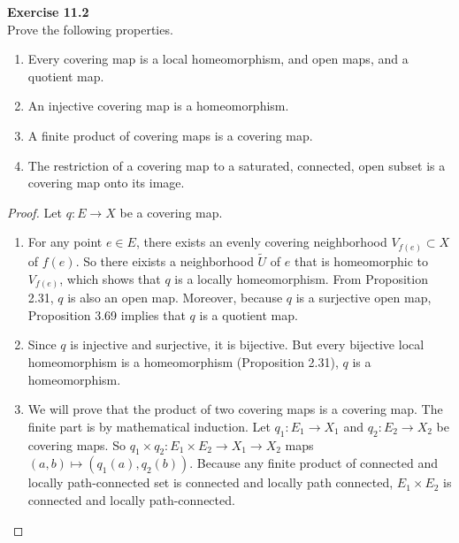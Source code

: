 \documentclass[12pt, a4paper]{article}
\theoremstyle{plain}
\def\tilde{\widetilde}
\newenvironment{exercise}[2][Exercise]
    { \begin{mdframed}[backgroundcolor=gray!20] \textbf{#1 #2} \\}
    {  \end{mdframed}}
\begin{document}
\begin{exercise}{11.2}
    Prove the following properties.
    \begin{enumerate}[label=(\alph*)]
        \item Every covering map is a local homeomorphism, and open maps, and a quotient map.
        \item An injective covering map is a homeomorphism.
        \item A finite product of covering maps is a covering map.
        \item The restriction of a covering map to a saturated, connected, open subset is a covering map onto its image.
    \end{enumerate}
\end{exercise}
    \begin{proof}
    Let $q\colon E\to X$ be a covering map.
    \begin{enumerate}[label=(\alph*)]
        \item For any point $e\in E$, there exists an evenly covering neighborhood $V_{f(e)}\subset X$ of $f(e)$. So there eixists a neighborhood $\tilde U$ of $e$ that is homeomorphic to $V_{f(e)}$, which shows that $q$ is a locally homeomorphism. From Proposition 2.31, $q$ is also an open map. Moreover, because $q$ is a surjective open map, Proposition 3.69 implies that $q$ is a quotient map.
        \item Since $q$ is injective and surjective, it is bijective. But every bijective local homeomorphism is a homeomorphism (Proposition 2.31), $q$ is a homeomorphism.
        \item We will prove that the product of two covering maps is a covering map. The finite part is by mathematical induction. Let $q_1\colon E_1\to X_1$ and $q_2\colon E_2\to X_2$ be covering maps. So $q_1\times q_2\colon E_1\times E_2\to X_1\to X_2$ maps $(a,b)\mapsto (q_1(a),q_2(b))$. Because any finite product of connected and locally path-connected set is connected and locally path connected, $E_1\times E_2$ is connected and locally path-connected.


\end{enumerate}
\end{proof}
\end{document}
